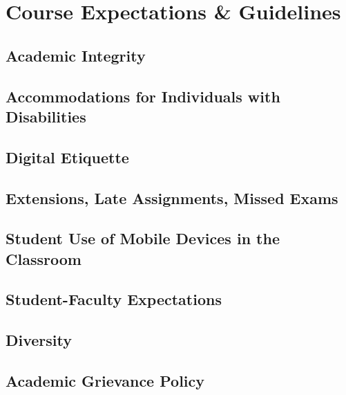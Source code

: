 \documentclass[letterpaper,oneside,10pt]{scrartcl}
\begin{document}

    
\section{Course Expectations \& Guidelines}
    
    \subsection{Academic Integrity}
        

    \subsection{Accommodations for Individuals with Disabilities}
        
        

        
    \subsection{Digital Etiquette}
        
        
    \subsection{Extensions, Late Assignments, Missed Exams}
        

    \subsection{Student Use of Mobile Devices in the Classroom}
        
        
    \subsection{Student-Faculty Expectations}
        
        
    \subsection{Diversity}
        
        
    \subsection{Academic Grievance Policy}
        
\end{document}
